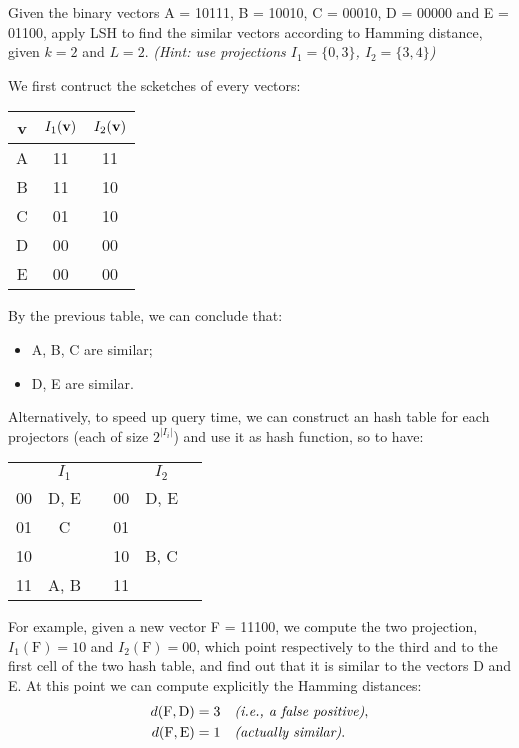 \exercise

Given the binary vectors A = 10111, B = 10010, C = 00010, D = 00000 and E =
01100, apply LSH to find the similar vectors according to Hamming distance,
given $k = 2$ and $L = 2$. \emph{(Hint: use projections $I_1 = \{0, 3\}$, $I_2 =
\{3, 4\}$)}

\solution

We first contruct the scketches of every vectors:
%
\begin{table}[h]
  \centering
  \begin{tabular}{c|c|c}
    {\bf v} & $I_1(\text{\bf v})$ & $I_2(\text{\bf v})$ \\ \hline
    A & 11 & 11 \\
    B & 11 & 10 \\
    C & 01 & 10 \\
    D & 00 & 00 \\
    E & 00 & 00 \\
  \end{tabular}
\end{table}
%
By the previous table, we can conclude that:
%
\begin{itemize}
  \item A, B, C are similar;
  \item D, E are similar.
\end{itemize}

Alternatively, to speed up query time, we can construct an hash table for each
projectors (each of size $2^{|I_i|}$) and use it as hash function, so to have:
%
\begin{table}[h]
  \centering
  \begin{tabular}{c|c|cc|c|c}
    \multicolumn{1}{c}{} &
    \multicolumn{1}{c}{$I_1$} &
    \multicolumn{1}{c}{} &
    \multicolumn{1}{c}{} &
    \multicolumn{1}{c}{$I_2$} & \\ \cline{2-2} \cline{5-5}
    00 & D, E & & 00 & D, E & \\ \cline{2-2} \cline{5-5}
    01 & C & & 01 & & \\ \cline{2-2} \cline{5-5}
    10 & & & 10 & B, C & \\ \cline{2-2} \cline{5-5}
    11 & A, B & & 11 & & \\ \cline{2-2} \cline{5-5}
  \end{tabular}
\end{table}

For example, given a new vector F = 11100, we compute the two projection,
$I_1(\text{F}) = 10$ and $I_2(\text{F}) = 00$, which point respectively to the
third and to the first cell of the two hash table, and find out that it is
similar to the vectors D and E. At this point we can compute explicitly the
Hamming distances:
%
\begin{align*}
  d(\text{F}, \text{D}) &= 3 \quad \text{\em (i.e., a false positive)},\\
  d(\text{F}, \text{E}) &= 1 \quad \text{\em (actually similar)}.
\end{align*}
